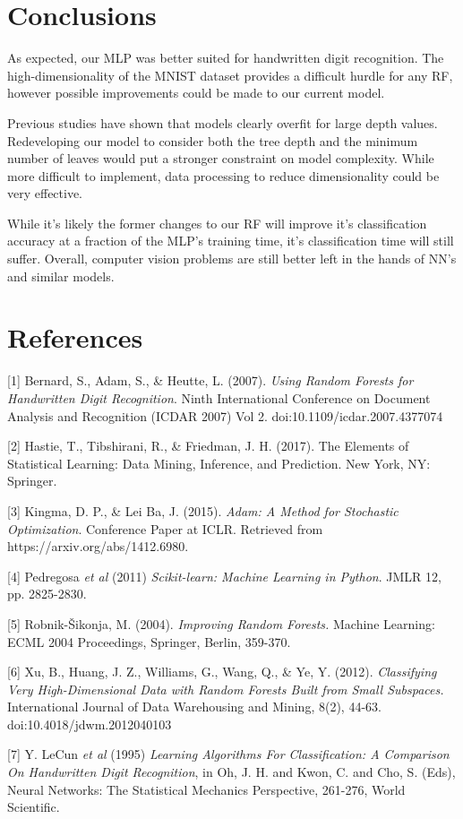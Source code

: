 \documentclass{article}
\begin{document}
\section{Conclusions}
As expected, our MLP was better suited for handwritten digit recognition. The high-dimensionality of the MNIST dataset provides a difficult hurdle for any RF, however possible improvements could be made to our current model.

Previous studies have shown that models clearly overfit for large depth values. Redeveloping our model to consider both the tree depth and the minimum number of leaves would put a stronger constraint on model complexity. While more difficult to implement, data processing to reduce dimensionality could be very effective.

While it's likely the former changes to our RF will improve it's classification accuracy at a fraction of the MLP's training time, it's classification time will still suffer. Overall, computer vision problems are still better left in the hands of NN's and similar models.

\clearpage

\section*{References}
\medskip

\small

[1] Bernard, S., Adam, S., & Heutte, L. (2007). \textit{Using Random Forests for Handwritten Digit Recognition}. Ninth International Conference on Document Analysis and Recognition (ICDAR 2007) Vol 2. doi:10.1109/icdar.2007.4377074

[2] Hastie, T., Tibshirani, R., & Friedman, J. H. (2017). The Elements of Statistical Learning: Data Mining, Inference, and Prediction. New York, NY: Springer.

[3] Kingma, D. P., & Lei Ba, J. (2015).
\textit{Adam: A Method for Stochastic Optimization}. Conference Paper at ICLR. Retrieved from https://arxiv.org/abs/1412.6980.

[4] Pedregosa \textit{et al} (2011) \textit{Scikit-learn: Machine Learning in Python}. JMLR 12, pp. 2825-2830.

[5] Robnik-Šikonja, M. (2004). \textit{Improving Random Forests.} Machine Learning: ECML 2004 Proceedings, Springer, Berlin, 359-370.

[6] Xu, B., Huang, J. Z., Williams, G., Wang, Q., & Ye, Y. (2012). \textit{Classifying Very High-Dimensional Data with Random Forests Built from Small Subspaces.} International Journal of Data Warehousing and Mining, 8(2), 44-63. doi:10.4018/jdwm.2012040103

[7] Y. LeCun \textit{et al} (1995) \textit{Learning Algorithms For Classification: A Comparison On Handwritten Digit Recognition}, in Oh, J. H. and Kwon, C. and Cho, S. (Eds), Neural Networks: The Statistical Mechanics Perspective, 261-276, World Scientific.
\end{document}
